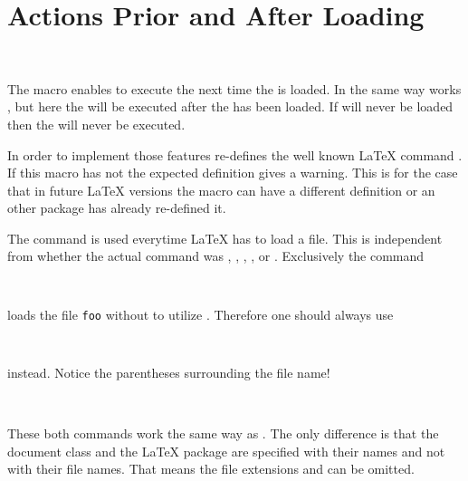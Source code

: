 \section{Actions Prior and After Loading}
\label{sec:scrlfile.macros}

\begin{Declaration}
  \\
\end{Declaration}%
%
%
The macro  enables to execute 
the next time the  is loaded.
In the same way works , but here the
 will be executed after the 
has been loaded.
If  will never be loaded then the 
will never be executed.

\begin{Explain}
  In order to implement those features 
  re-defines the well known \LaTeX{} command
  .
  If this macro has not the expected definition 
  gives a warning.
  This is for the case that in future \LaTeX{} versions
  the macro can have a different definition or an other package
  has already re-defined it.
  
  The command  is used 
  everytime \LaTeX{} has to load a file.
  This is independent from whether the actual command was ,
  , , ,
  or . Exclusively the command
\begin{lstlisting}
  
\end{lstlisting}
  loads the file \texttt{foo} without to utilize
  . Therefore one should always use
\begin{lstlisting}
  
\end{lstlisting}
  instead. Notice the parentheses surrounding the file name!
\end{Explain}
%
%
%

\begin{Declaration}
  \\
\end{Declaration}%
%
%
These both commands work the same way as .
The only difference is that the document class 
and the \LaTeX{} package  are specified
with their names and not with their file names.
That means the file extensions  and 
can be omitted.
%
%
%

